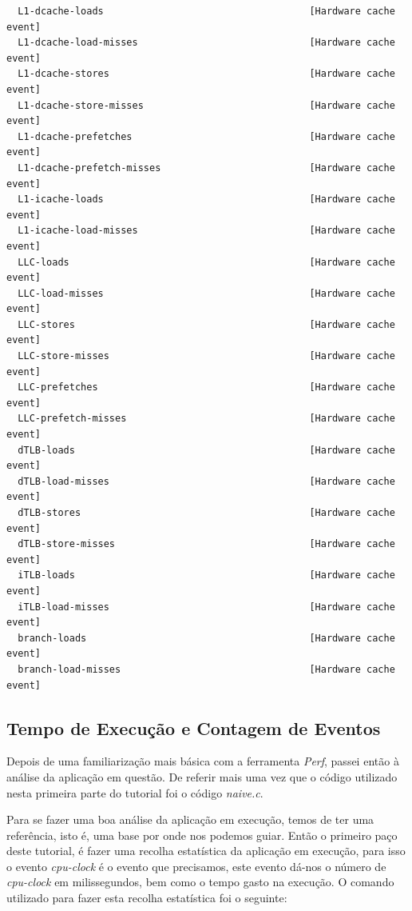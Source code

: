 \documentclass[conference,compsoc]{IEEEtran}
\begin{document}
\begin{lstlisting}
  L1-dcache-loads                                    [Hardware cache event]
  L1-dcache-load-misses                              [Hardware cache event]
  L1-dcache-stores                                   [Hardware cache event]
  L1-dcache-store-misses                             [Hardware cache event]
  L1-dcache-prefetches                               [Hardware cache event]
  L1-dcache-prefetch-misses                          [Hardware cache event]
  L1-icache-loads                                    [Hardware cache event]
  L1-icache-load-misses                              [Hardware cache event]
  LLC-loads                                          [Hardware cache event]
  LLC-load-misses                                    [Hardware cache event]
  LLC-stores                                         [Hardware cache event]
  LLC-store-misses                                   [Hardware cache event]
  LLC-prefetches                                     [Hardware cache event]
  LLC-prefetch-misses                                [Hardware cache event]
  dTLB-loads                                         [Hardware cache event]
  dTLB-load-misses                                   [Hardware cache event]
  dTLB-stores                                        [Hardware cache event]
  dTLB-store-misses                                  [Hardware cache event]
  iTLB-loads                                         [Hardware cache event]
  iTLB-load-misses                                   [Hardware cache event]
  branch-loads                                       [Hardware cache event]
  branch-load-misses                                 [Hardware cache event]
\end{lstlisting}

\subsection{Tempo de Execução e Contagem de Eventos}

Depois de uma familiarização mais básica com a ferramenta \textit{Perf}, passei então à análise da aplicação em questão. De referir mais uma vez que o código utilizado nesta primeira parte do tutorial foi o código \textit{naive.c}.

Para se fazer uma boa análise da aplicação em execução, temos de ter uma referência, isto é, uma base por onde nos podemos guiar. Então o primeiro paço deste tutorial, é fazer uma recolha estatística da aplicação em execução, para isso o evento \textit{cpu-clock} é o evento que precisamos, este evento dá-nos o número de \textit{cpu-clock} em milissegundos, bem como o tempo gasto na execução. O comando utilizado para fazer esta recolha estatística foi o seguinte:
\end{document}
